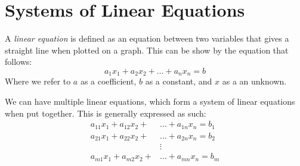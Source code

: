 \section{Systems of Linear Equations}

A \emph{linear equation} is defined as an equation between two variables that gives
a straight line when plotted on a graph. This can be show by the equation
that follows: 
\begin{equation}a_1x_1 + a_2x_2+\ldots+a_nx_n=b\end{equation}
Where we refer to $a$ as a coefficient, $b$ as a constant, and $x$ as a an unknown.

We can have multiple linear equations, which form a system of linear
equations when put together. This is generally expressed as such:
\begin{equation}
    \begin{split}
        a_{11}x_1 + a_{12}x_2+&\ldots+a_{1n}x_n  = b_1\\
        a_{21}x_1 + a_{22}x_2+&\ldots+a_{2n}x_n  = b_2\\
                              &\vdots\\
        a_{m1}x_1 + a_{m2}x_2+&\ldots+a_{mn}x_n  = b_m\\
    \end{split}
\end{equation}
